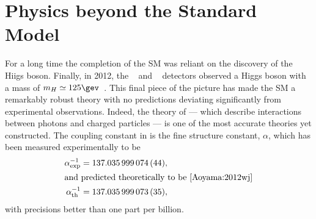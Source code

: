 \section{Physics beyond the Standard Model}
\label{sec:bsm}

For a long time the completion of the SM was reliant on the discovery of the Hiigs boson.
Finally, in 2012, the \cms~\cite{Chatrchyan:2008aa} and \atlas~\cite{Aad:2008zzm} detectors
observed a Higgs boson with a mass of $m_H\simeq125\gev$~\cite{Chatrchyan:2012ufa,Aad:2012tfa}.
This final piece of the picture has made the SM a remarkably robust theory with no predictions
deviating significantly from experimental observations.
Indeed, the theory of \QED --- which describe interactions between
photons and charged particles --- is one of the most accurate theories yet constructed.
The coupling constant in \QED is the fine structure constant, $\alpha$, which has been measured
experimentally to be~\cite{PDG2012}
\begin{align}
  \alpha^{-1}_\mathrm{exp} &= 137.035\,999\,074\,(44), \nonumber\\
  \intertext{and predicted theoretically to be~\cite{Aoyama:2012wj}}
  \alpha^{-1}_\mathrm{th} &= 137.035\,999\,073\,(35), \nonumber
\end{align}
with precisions better than one part per billion.



